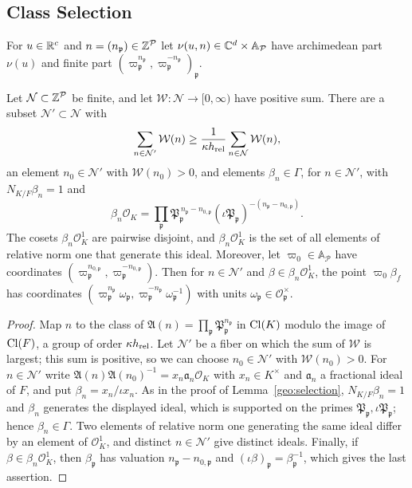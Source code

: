 \subsection{Class Selection}

For $u\in\mathbb R^c$ and $n=(n_{\mathfrak p})\in\mathbb Z^{\mathcal P}$ let
$\nu(u,n)\in\mathbb C^d\times\mathbb A_{\mathcal P}$ have archimedean part
$\nu(u)$ and finite part $(\varpi_{\mathfrak p}^{n_{\mathfrak
p}},\varpi_{\mathfrak p}^{-n_{\mathfrak p}})_{\mathfrak p}$.

\begin{lemma}\label{fw:selection}
Let $\mathcal N\subset\mathbb Z^{\mathcal P}$ be finite, and let
$\mathcal W\colon\mathcal N\to[0,\infty)$ have positive sum. There are a
subset $\mathcal N'\subset\mathcal N$ with
\[
 \sum_{n\in\mathcal N'}\mathcal W(n)\ge\frac1{\kappa h_{\rm rel}}
 \sum_{n\in\mathcal N}\mathcal W(n),
\]
an element $n_0\in\mathcal N'$ with $\mathcal W(n_0)>0$, and elements
$\beta_n\in\Gamma$, for $n\in\mathcal N'$, with $N_{K/F}\beta_n=1$ and
\[
 \beta_n\mathcal O_K=\prod_{\mathfrak p}\mathfrak P_{\mathfrak
 p}^{\,n_{\mathfrak p}-n_{0,\mathfrak p}}
 (\iota\mathfrak P_{\mathfrak p})^{-(n_{\mathfrak p}-n_{0,\mathfrak p})}.
\]
The cosets $\beta_n\mathcal O_K^1$ are pairwise disjoint, and
$\beta_n\mathcal O_K^1$ is the set of all elements of relative norm one
that generate this ideal. Moreover, let $\varpi_0\in\mathbb A_{\mathcal
P}$ have coordinates $(\varpi_{\mathfrak p}^{n_{0,\mathfrak
p}},\varpi_{\mathfrak p}^{-n_{0,\mathfrak p}})$. Then for $n\in\mathcal
N'$ and $\beta\in\beta_n\mathcal O_K^1$, the point $\varpi_0\beta_f$ has
coordinates $(\varpi_{\mathfrak p}^{n_{\mathfrak p}}\omega_{\mathfrak
p},\varpi_{\mathfrak p}^{-n_{\mathfrak p}}\omega_{\mathfrak p}^{-1})$
with units $\omega_{\mathfrak p}\in\mathcal O_{\mathfrak p}^\times$.
\end{lemma}

\begin{proof}
Map $n$ to the class of $\mathfrak A(n)=\prod_{\mathfrak p}\mathfrak
P_{\mathfrak p}^{n_{\mathfrak p}}$ in $\operatorname{Cl}(K)$ modulo the image of
$\operatorname{Cl}(F)$, a group of order $\kappa h_{\rm rel}$. Let $\mathcal N'$ be a
fiber on which the sum of $\mathcal W$ is largest; this sum is positive,
so we can choose $n_0\in\mathcal N'$ with $\mathcal W(n_0)>0$. For
$n\in\mathcal N'$ write $\mathfrak A(n)\mathfrak
A(n_0)^{-1}=x_n\mathfrak a_n\mathcal O_K$ with $x_n\in K^\times$ and
$\mathfrak a_n$ a fractional ideal of $F$, and put
$\beta_n=x_n/\iota x_n$. As in the proof of Lemma~\ref{geo:selection},
$N_{K/F}\beta_n=1$ and $\beta_n$ generates the displayed ideal, which
is supported on the primes $\mathfrak P_{\mathfrak p},\iota\mathfrak
P_{\mathfrak p}$; hence $\beta_n\in\Gamma$. Two elements of relative
norm one generating the same ideal differ by an element of $\mathcal
O_K^1$, and distinct $n\in\mathcal N'$ give distinct ideals. Finally, if
$\beta\in\beta_n\mathcal O_K^1$, then $\beta_{\mathfrak p}$ has
valuation $n_{\mathfrak p}-n_{0,\mathfrak p}$ and $(\iota\beta)_{\mathfrak
p}=\beta_{\mathfrak p}^{-1}$, which gives the last assertion.
\end{proof}

